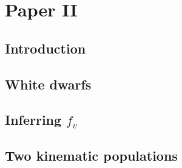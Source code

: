 \chapter{Paper II}\label{chap:paper2}
\section{Introduction}\label{sec:p2-intro}

\section{White dwarfs}\label{sec:p2-whitedwarfs}

\section{Inferring $f_v$}\label{sec:p2-inferring}

\section{Two kinematic populations}\label{sec:p2-populations}